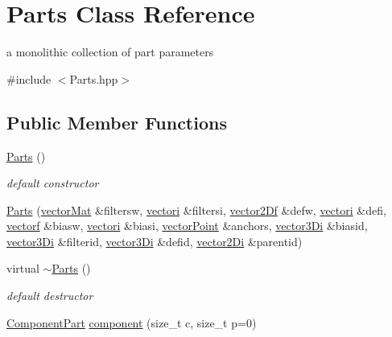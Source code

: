 \hypertarget{classParts}{\section{\-Parts \-Class \-Reference}
\label{classParts}
}


a monolithic collection of part parameters  




{\ttfamily \#include $<$\-Parts.\-hpp$>$}

\subsection*{\-Public \-Member \-Functions}
\begin{DoxyCompactItemize}
\item 
\hyperlink{classParts_a02ffe7271c4e268ee934710f91a203eb}{\-Parts} ()
\begin{DoxyCompactList}\small\item\em default constructor \end{DoxyCompactList}\item 
\hyperlink{classParts_ac8e1ad21c900825480d3f0e241808757}{\-Parts} (\hyperlink{types_8hpp_a3207a7addcfa415d1c83622febcb1e9b}{vector\-Mat} \&filtersw, \hyperlink{types_8hpp_a44529587d60e73bf0e689a82e5e70a55}{vectori} \&filtersi, \hyperlink{types_8hpp_a94f2d563f3725231a6f684b4dce4f1ef}{vector2\-Df} \&defw, \hyperlink{types_8hpp_a44529587d60e73bf0e689a82e5e70a55}{vectori} \&defi, \hyperlink{types_8hpp_a4da5db3ee9e284f719ef5764dbadffc8}{vectorf} \&biasw, \hyperlink{types_8hpp_a44529587d60e73bf0e689a82e5e70a55}{vectori} \&biasi, \hyperlink{types_8hpp_ac468fcf6870d6563ac8fa3669845afcc}{vector\-Point} \&anchors, \hyperlink{types_8hpp_a1f7c8ad00a53fb2d61b3656da9a6581d}{vector3\-Di} \&biasid, \hyperlink{types_8hpp_a1f7c8ad00a53fb2d61b3656da9a6581d}{vector3\-Di} \&filterid, \hyperlink{types_8hpp_a1f7c8ad00a53fb2d61b3656da9a6581d}{vector3\-Di} \&defid, \hyperlink{types_8hpp_a93a5e2cfd40d1ff1f10d8bbf11884c41}{vector2\-Di} \&parentid)
\item 
virtual \hyperlink{classParts_ac2df1f1a1d41444dff8ed4d4343aa64d}{$\sim$\-Parts} ()
\begin{DoxyCompactList}\small\item\em default destructor \end{DoxyCompactList}\item 
\hyperlink{classComponentPart}{\-Component\-Part} \hyperlink{classParts_ae4cd6034cce85efe0fa1b55bf5b2da47}{component} (size\-\_\-t c, size\-\_\-t p=0)

\end{DoxyCompactItemize}
